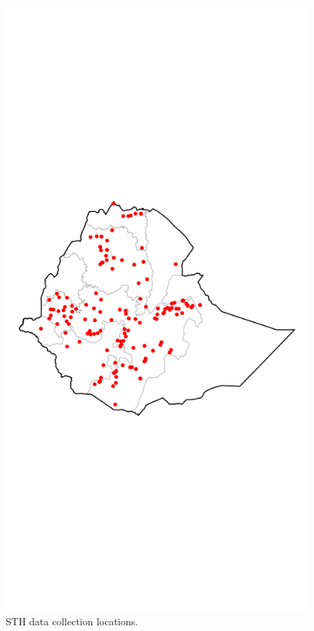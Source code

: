 \documentclass[
]{article}
\begin{document}
\begin{figure}
\centering
\includegraphics{write_up_files/figure-latex/STH_locations-1.pdf}
\caption{STH data collection locations.}
\end{figure}
\end{document}
